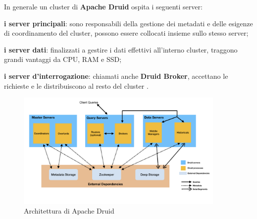 In generale un \gls{cluster}{} di \textbf{Apache Druid} ospita i seguenti server: 
\begin{list}{*}
    \item \textbf{i server principali}: sono responsabili della gestione dei \gls{metadati}{} e delle esigenze di coordinamento del \gls{cluster}{}, possono essere collocati insieme sullo stesso server;
    \item \item \textbf{i server dati}: finalizzati a  gestire i dati effettivi all'interno \gls{cluster}{}, traggono grandi vantaggi da CPU, RAM e SSD;
    \item  \textbf{i server d'interrogazione}: chiamati anche \textbf{Druid Broker}, accettano le richieste e le distribuiscono al resto del cluster \cite{site:Doc_Druid}.
\end{list}
\begin{figure}[h]   
    \centering
    \includegraphics[width=0.9\textwidth]{images/componenti/druid_architectcture.png}
    \caption{Architettura di Apache Druid}
    \label{fig:druid_architecture}
\end{figure}
\pagebreak
